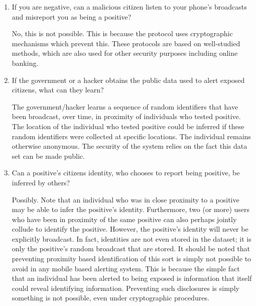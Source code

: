\documentclass{article}
\begin{document}
\begin{enumerate}[leftmargin=*]

\item If you are negative, can a malicious citizen listen to your phone's broadcasts and misreport you as being a positive?
   
   No, this is not possible. This is because the protocol uses cryptographic mechanisms which prevent this. These protocols are based on well-studied methods, which are also used for other security purposes including online banking.


\item If the government or a hacker obtains the public data used to alert exposed citizens, what can they learn?

  The government/hacker learns a sequence of random identifiers that have been broadcast, over time, in proximity of individuals who tested positive. The location of the individual who tested positive could be inferred if these random identifiers were collected at specific locations. The individual remains otherwise anonymous. The security of the system relies on the fact this data set can be made public.


\item Can a positive's citizens identity, who chooses to report being positive, be inferred by others? 

Possibly. Note that an individual who was in close proximity to a positive may be able to infer the positive's identity.  
Furthermore, two (or more) users who have been in proximity of the same positive can also perhaps jointly collude to identify the positive.
However, the positive's identity will never be explicitly broadcast. In fact, identities are not even  stored in the dataset; it is only the positive's random broadcast that are stored.
It should be noted that preventing proximity based identification of this sort is simply not possible to avoid in any mobile based alerting system. This is because the simple fact that an individual has been alerted to being exposed is information that itself could reveal identifying information.  Preventing such disclosures is simply something is not possible, even under cryptographic procedures.


\end{enumerate}
\end{document}
